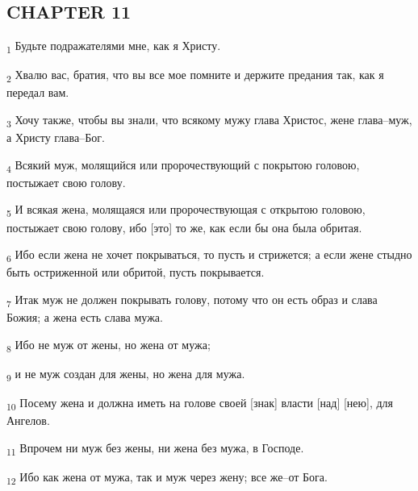 \subsection{CHAPTER 11}
\begin{tcolorbox}
\textsubscript{1} Будьте подражателями мне, как я Христу.
\end{tcolorbox}
\begin{tcolorbox}
\textsubscript{2} Хвалю вас, братия, что вы все мое помните и держите предания так, как я передал вам.
\end{tcolorbox}
\begin{tcolorbox}
\textsubscript{3} Хочу также, чтобы вы знали, что всякому мужу глава Христос, жене глава--муж, а Христу глава--Бог.
\end{tcolorbox}
\begin{tcolorbox}
\textsubscript{4} Всякий муж, молящийся или пророчествующий с покрытою головою, постыжает свою голову.
\end{tcolorbox}
\begin{tcolorbox}
\textsubscript{5} И всякая жена, молящаяся или пророчествующая с открытою головою, постыжает свою голову, ибо [это] то же, как если бы она была обритая.
\end{tcolorbox}
\begin{tcolorbox}
\textsubscript{6} Ибо если жена не хочет покрываться, то пусть и стрижется; а если жене стыдно быть остриженной или обритой, пусть покрывается.
\end{tcolorbox}
\begin{tcolorbox}
\textsubscript{7} Итак муж не должен покрывать голову, потому что он есть образ и слава Божия; а жена есть слава мужа.
\end{tcolorbox}
\begin{tcolorbox}
\textsubscript{8} Ибо не муж от жены, но жена от мужа;
\end{tcolorbox}
\begin{tcolorbox}
\textsubscript{9} и не муж создан для жены, но жена для мужа.
\end{tcolorbox}
\begin{tcolorbox}
\textsubscript{10} Посему жена и должна иметь на голове своей [знак] власти [над] [нею], для Ангелов.
\end{tcolorbox}
\begin{tcolorbox}
\textsubscript{11} Впрочем ни муж без жены, ни жена без мужа, в Господе.
\end{tcolorbox}
\begin{tcolorbox}
\textsubscript{12} Ибо как жена от мужа, так и муж через жену; все же--от Бога.
\end{tcolorbox}
